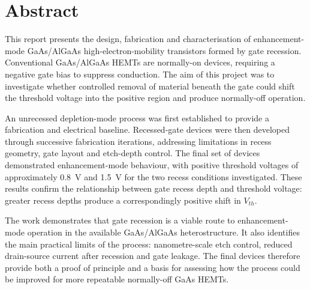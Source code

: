 \chapter*{Abstract}

This report presents the design, fabrication and characterisation 
of enhancement-mode GaAs/AlGaAs high-electron-mobility transistors formed by gate
recession. Conventional GaAs/AlGaAs HEMTs are normally-on devices, requiring a
negative gate bias to suppress conduction. The aim of this project was to
investigate whether controlled removal of material beneath the gate could shift
the threshold voltage into the positive region and produce normally-off
operation.

An unrecessed depletion-mode process was first established to provide a
fabrication and electrical baseline. Recessed-gate devices were then developed
through successive fabrication iterations, addressing limitations in recess
geometry, gate layout and etch-depth control. The final set of devices
demonstrated enhancement-mode behaviour, with positive threshold voltages of
approximately \SI{0.8}{\volt} and \SI{1.5}{\volt} for the two recess conditions
investigated. These results confirm the relationship between gate recess 
depth and threshold voltage: greater recess depths produce 
a correspondingly positive shift in $V_{th}$.

The work demonstrates that gate recession is a viable route to
enhancement-mode operation in the available GaAs/AlGaAs heterostructure. It
also identifies the main practical limits of the process: nanometre-scale etch
control, reduced drain-source current after recession and gate leakage. 
The final devices therefore provide both a proof of principle and a basis for 
assessing how the process could be improved for more repeatable 
normally-off GaAs HEMTs.
